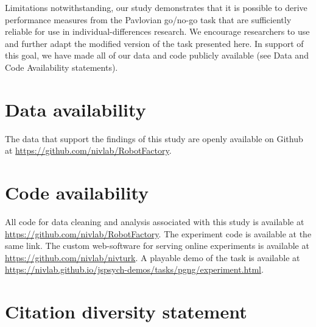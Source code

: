 \documentclass[a4paper,12pt]{article}
\begin{document}
\begin{refsection}[main]
Limitations notwithstanding, our study demonstrates that it is possible to derive performance measures from the Pavlovian go/no-go task that are sufficiently reliable for use in individual-differences research. We encourage researchers to use and further adapt the modified version of the task presented here. In support of this goal, we have made all of our data and code publicly available (see Data and Code Availability statements).

\break
\section*{Data availability}

The data that support the findings of this study are openly available on Github at \url{https://github.com/nivlab/RobotFactory}.

\section*{Code availability}

All code for data cleaning and analysis associated with this study is available at \url{https://github.com/nivlab/RobotFactory}. The experiment code is available at the same link.  The custom web-software for serving online experiments is available at \url{https://github.com/nivlab/nivturk}. A playable demo of the task is available at \url{https://nivlab.github.io/jspsych-demos/tasks/pgng/experiment.html}.

\section*{Citation diversity statement}


\end{refsection}
\end{document}
